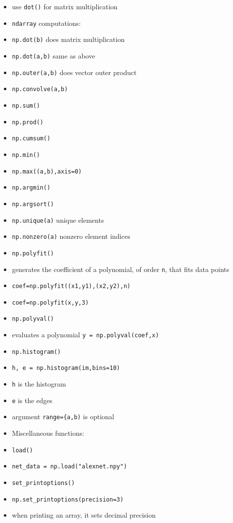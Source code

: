 \documentclass[onecolumn]{IEEEtran} %
\begin{document}
\begin{itemize}
        \item use \verb|dot()| for matrix multiplication
    \ei
     \item \verb|ndarray| computations:
     \bi
        \item \verb|np.dot(b)| does matrix multiplication
        \item \verb|np.dot(a,b)| same as above
        \item \verb|np.outer(a,b)| does vector outer product
        \item \verb|np.convolve(a,b)|
        \item \verb|np.sum()|
        \item \verb|np.prod()|
        \item \verb|np.cumsum()|
        \item \verb|np.min()|
        \item \verb|np.max((a,b),axis=0)|
        \item \verb|np.argmin()|
        \item \verb|np.argsort()|
        \item \verb|np.unique(a)| unique elements
        \item \verb|np.nonzero(a)| nonzero element indices
        \item \verb|np.polyfit()|
        \bi
            \item generates the coefficient of a polynomial, of order \verb|n|, that fits data points
            \item \verb|coef=np.polyfit((x1,y1),(x2,y2),n)|
            \item \verb|coef=np.polyfit(x,y,3)|
        \ei
         \item \verb|np.polyval()|
        \bi
            \item evaluates a polynomial \newline
            \verb|y = np.polyval(coef,x)|
        \ei
        \item \verb|np.histogram()|
        \bi
            \item \verb|h, e = np.histogram(im,bins=10)|
            \item \verb|h| is the histogram
            \item \verb|e| is the edges
            \item argument \verb|range={a,b)| is optional
        \ei
    \ei
    \item Miscellaneous functions:
    \bi
        \item \verb|load()|
        \bi
            \item \verb|net_data = np.load("alexnet.npy")|
        \ei
        \item \verb|set_printoptions()|
        \bi
            \item \verb|np.set_printoptions(precision=3)|
            \item when printing an array, it sets decimal precision
        \ei
    \ei
\end{itemize}
\end{document}
